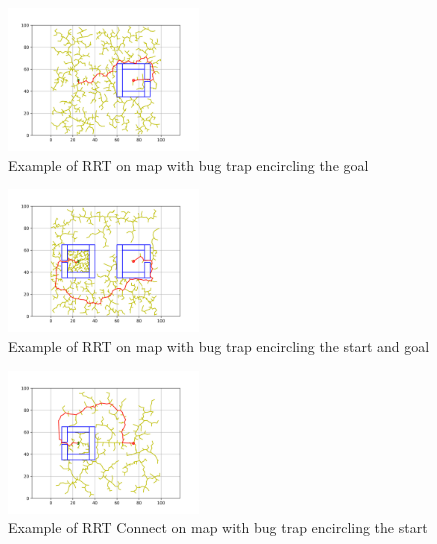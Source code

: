 \documentclass{article}
\begin{document}
\begin{figure}[H]
    \begin{center}
        \includegraphics[width=0.45\textwidth]{figures/final_path_RRT_4.png}
    \end{center}
    \caption{Example of RRT on map with bug trap encircling the goal}\label{fig:RRT_4}
\end{figure}
\begin{figure}[H]
    \begin{center}
        \includegraphics[width=0.45\textwidth]{figures/final_path_RRT_5.png}
    \end{center}
    \caption{Example of RRT on map with bug trap encircling the start and goal}\label{fig:RRT_5}
\end{figure}
\begin{figure}[H]
    \begin{center}
        \includegraphics[width=0.45\textwidth]{figures/final_path_RRT_Connect_3.png}
    \end{center}
    \caption{Example of RRT Connect on map with bug trap encircling the start}\label{fig:RRT_Connect_3}
\end{figure}
\end{document}
